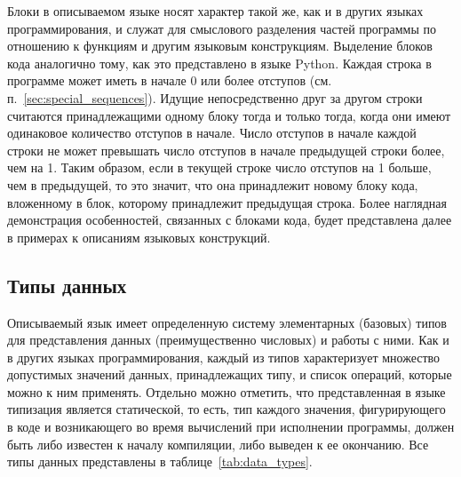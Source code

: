 Блоки в описываемом языке носят характер такой же, как и в других языках программирования, и служат для смыслового разделения частей программы по отношению к функциям и другим языковым конструкциям.
Выделение блоков кода аналогично тому, как это представлено в языке Python.
Каждая строка в программе может иметь в начале 0 или более отступов (см. п.~\ref{sec:special_sequences}).
Идущие непосредственно друг за другом строки считаются принадлежащими одному блоку тогда и только тогда, когда они имеют одинаковое количество отступов в начале.
Число отступов в начале каждой строки не может превышать число отступов в начале предыдущей строки более, чем на 1.
Таким образом, если в текущей строке число отступов на 1 больше, чем в предыдущей, то это значит, что она принадлежит новому блоку кода, вложенному в блок, которому принадлежит предыдущая строка.
Более наглядная демонстрация особенностей, связанных с блоками кода, будет представлена далее в примерах к описаниям языковых конструкций.

\subsection{Типы данных}
\label{sec:data_types}

Описываемый язык имеет определенную систему элементарных (базовых) типов для представления данных (преимущественно числовых) и работы с ними.
Как и в других языках программирования, каждый из типов характеризует множество допустимых значений данных, принадлежащих типу, и список операций, которые можно к ним применять.
Отдельно можно отметить, что представленная в языке типизация является статической, то есть, тип каждого значения, фигурирующего в коде и возникающего во время вычислений при исполнении программы, должен быть либо известен к началу компиляции, либо выведен к ее окончанию.
Все типы данных представлены в таблице~\ref{tab:data_types}.

